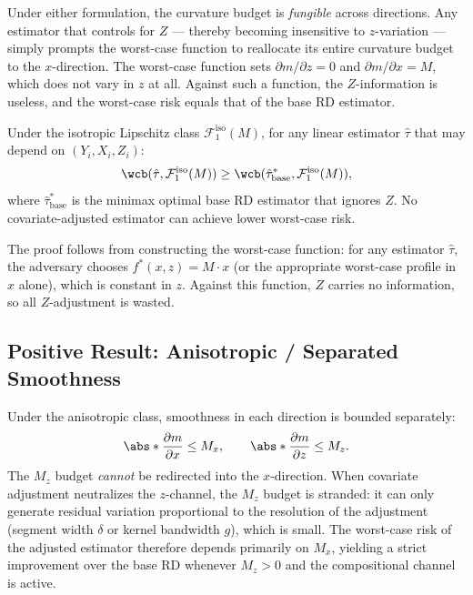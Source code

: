 Under either formulation, the curvature budget is \emph{fungible} across directions.
Any estimator that controls for $Z$ --- thereby becoming insensitive to $z$-variation --- simply prompts the worst-case function to reallocate its entire curvature budget to the $x$-direction.
The worst-case function sets $\partial m / \partial z = 0$ and $\partial m / \partial x = M$, which does not vary in $z$ at all.
Against such a function, the $Z$-information is useless, and the worst-case risk equals that of the base RD estimator.

\begin{theorem}\label{thm:negative_informal}
	Under the isotropic Lipschitz class $\mathcal{F}_1^{\mathrm{iso}}(M)$, for any linear estimator $\hat\tau$ that may depend on $(Y_i, X_i, Z_i)$:
	\begin{equation*}
		\wcb(\hat\tau, \mathcal{F}_1^{\mathrm{iso}}(M)) \geq \wcb(\hat\tau^*_{\mathrm{base}}, \mathcal{F}_1^{\mathrm{iso}}(M)),
	\end{equation*}
	where $\hat\tau^*_{\mathrm{base}}$ is the minimax optimal base RD estimator that ignores $Z$.
	No covariate-adjusted estimator can achieve lower worst-case risk.
\end{theorem}

The proof follows from constructing the worst-case function: for any estimator $\hat\tau$, the adversary chooses $f^*(x,z) = M \cdot x$ (or the appropriate worst-case profile in $x$ alone), which is constant in $z$.
Against this function, $Z$ carries no information, so all $Z$-adjustment is wasted.


\subsection{Positive Result: Anisotropic / Separated Smoothness}\label{sec:overview:positive}

Under the anisotropic class, smoothness in each direction is bounded separately:
\begin{equation*}
	\abs*{\frac{\partial m}{\partial x}} \leq M_x, \qquad \abs*{\frac{\partial m}{\partial z}} \leq M_z.
\end{equation*}
The $M_z$ budget \emph{cannot} be redirected into the $x$-direction.
When covariate adjustment neutralizes the $z$-channel, the $M_z$ budget is stranded: it can only generate residual variation proportional to the resolution of the adjustment (segment width $\delta$ or kernel bandwidth $g$), which is small.
The worst-case risk of the adjusted estimator therefore depends primarily on $M_x$, yielding a strict improvement over the base RD whenever $M_z > 0$ and the compositional channel is active.

